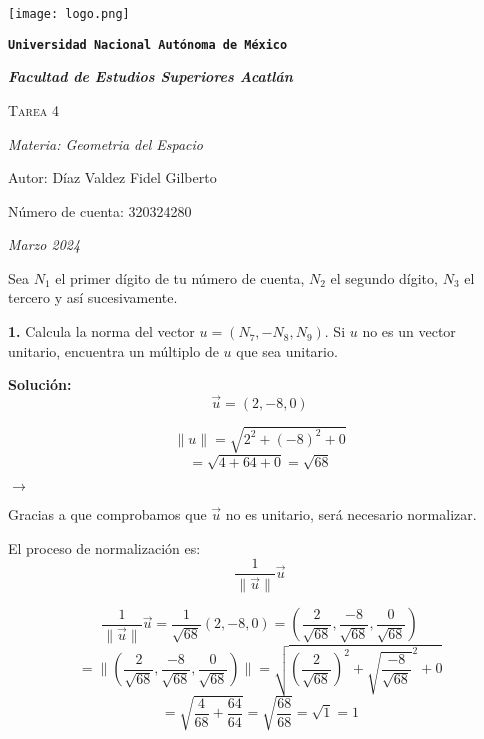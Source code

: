 \documentclass{article}
\begin{document}
\begin{titlepage}
   \centering   
   {\texttt{[image: logo.png]}\par}
   {\texttt{\bfseries \LARGE Universidad Nacional Autónoma de México} \par}
   \vspace{1cm}
   {\itshape \Large \bfseries Facultad de Estudios Superiores Acatlán \par}
   \vspace{3cm}
   {\scshape \Huge Tarea 4 \par}
   \vspace {3cm}
   {\slshape \Large Materia: Geometria del Espacio \par}
   \vspace{2cm}
   {\Large Autor: Díaz Valdez Fidel Gilberto\par}
   {\Large Número de cuenta: 320324280\par}
   \vfill
   {\itshape Marzo 2024 \par}
\end{titlepage}


Sea $N_1$ el primer dígito de tu número de cuenta, $N_2$ el segundo dígito, $N_3$ el tercero y así
sucesivamente.
\par


\textbf{1.} Calcula la norma del vector $u = (N_7, -N_8, N_9)$. Si $u$ no es un vector unitario, encuentra
un múltiplo de $u$ que sea unitario.
\par


\textbf{Solución:}
$$\vec{u} = (2, -8, 0)$$
\vspace{10pt}


\begin{minipage}[c]{0.5cm}
   $$\|u\| = \sqrt{2^2+(-8)^2+0}$$
   $$= \sqrt{4+64+0} = \sqrt{68}$$
\end{minipage}\hspace*{4cm}
$\rightarrow$\hspace*{0.5cm}
\begin{minipage}[c]{6cm}
   Gracias a que comprobamos que $\vec{u}$ no es unitario,
   será necesario normalizar.
   \par


   El proceso de normalización es:
   $$\frac{1}{\|\vec{u}\|}\vec{u}$$
\end{minipage}
\vspace{10pt}


$$\frac{1}{\|\vec{u}\|}\vec{u} = \frac{1}{\sqrt{68}}(2,-8,0)= (\frac{2}{\sqrt{68}}, \frac{-8}{\sqrt{68}}, \frac{0}{\sqrt{68}})$$
$$= \|(\frac{2}{\sqrt{68}}, \frac{-8}{\sqrt{68}}, \frac{0}{\sqrt{68}})\| = \sqrt{(\frac{2}{\sqrt{68}})^2+ \sqrt{\frac{-8}{\sqrt{68}}}^2+0}$$
$$= \sqrt{\frac{4}{68}+\frac{64}{64}} = \sqrt{\frac{68}{68}} = \sqrt{1} = 1$$
\end{document}
